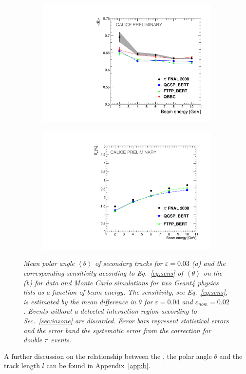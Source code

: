 \begin{figure}
	\centering
	\begin{subfigure}{0.5\textwidth}
		\centering
		\includegraphics[width=.90\linewidth]{ECAL/plots/theta-graph.pdf}
		\caption{\label{fig:thetagraph}}
	\end{subfigure}%
	\begin{subfigure}{0.5\textwidth}
		\centering
		\includegraphics[width=.90\linewidth]{ECAL/plots/delta-theta-graph.pdf}
		\caption{\label{fig:dthetagraph} }
	\end{subfigure}
	\caption{\label{fig:fullthetagraph} \sl Mean polar angle $\left<\theta\right>$ of secondary tracks for $\varepsilon = 0.03$  (a) and the corresponding sensitivity according to Eq.~\ref{eq:sens} of $\left<\theta\right>$ on the \ep\,(b) for data and Monte Carlo simulations for two {\sc Geant}4 physics lists as a function of beam energy. The sensitivity, see Eq.~\ref{eq:sens}, is estimated by the mean difference in $\theta$ for $\varepsilon = 0.04$ and $\varepsilon_{nom} = 0.02$. Events without a detected interaction region according to Sec.~\ref{sec:iazone} are discarded. Error bars represent statistical errors and the error band the systematic error from the correction for double $\pi$ events.}
\end{figure}
A further discussion on the relationship between the \ep ,  the polar angle $\theta$ and the track length $l$ can be found in Appendix~\ref{app:b}.


